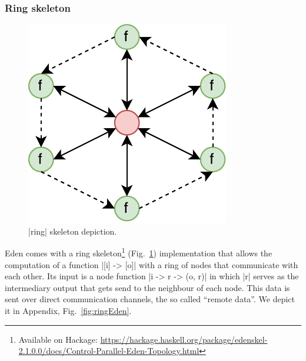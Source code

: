 
\subsubsection{Ring skeleton} \label{sec:ring}
\begin{figure}[tb]
	\includegraphics[scale=0.75]{images/ring}
	\caption{|ring| skeleton depiction.}
	\label{fig:ringImg}
\end{figure}
Eden comes with a ring skeleton\footnote{Available on Hackage: \url{https://hackage.haskell.org/package/edenskel-2.1.0.0/docs/Control-Parallel-Eden-Topology.html}} (Fig.~\ref{fig:ringImg}) implementation that allows the computation of a function |[i] -> [o]| with a ring of nodes that communicate with each other. Its input is a node function |i -> r -> (o, r)| in which |r| serves as the intermediary output that gets send to the neighbour of each node. This data is sent over direct communication channels, the so called \enquote{remote data}. We depict it in Appendix, Fig.~\ref{fig:ringEden}.


